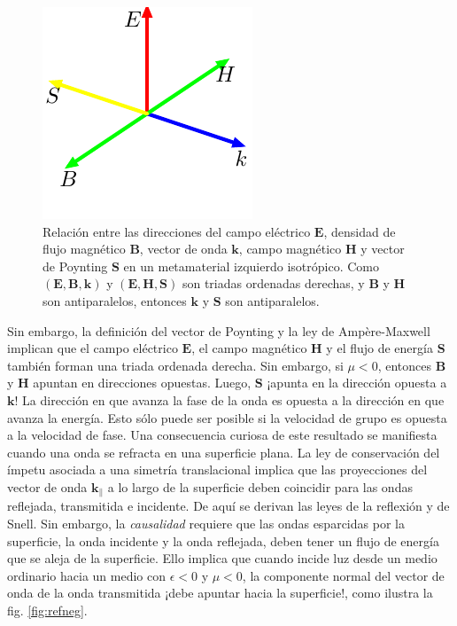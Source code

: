 \documentclass[12pt]{article}
\begin{document}
\begin{figure}
  \centering
  \includegraphics{talk-13}
  \caption{Relación entre las direcciones del campo eléctrico $\bm E$,
    densidad de flujo magnético $\bm B$, vector de onda $\bm k$, campo
    magnético $\bm H$ y vector de Poynting $\bm S$ en un metamaterial
    izquierdo isotrópico. Como $(\bm E, \bm B, \bm k)$ y
    $(\bm E, \bm H,\bm S)$ son triadas ordenadas derechas, y $\bm B$ y
    $\bm H$ son antiparalelos, entonces $\bm k$ y $\bm S$ son
    antiparalelos.  }
  \label{fig:triada}
\end{figure}
Sin embargo, la definición del vector de Poynting y la ley de
Ampère-Maxwell implican que el campo eléctrico $\bm E$, el campo
magnético $\bm H$ y el flujo de energía $\bm S$ también forman una
triada ordenada derecha. Sin embargo, si $\mu<0$, entonces $\bm B$ y
$\bm H$ apuntan en direcciones opuestas. Luego, $\bm S$ ¡apunta en la
dirección opuesta a $\bm k$! La dirección en que avanza la fase de la
onda es opuesta a la dirección en que avanza la energía. Esto sólo
puede ser posible si la velocidad de grupo es opuesta a la velocidad
de fase. Una consecuencia curiosa de este resultado se manifiesta
cuando una onda se refracta en una superficie plana. La ley de
conservación del ímpetu asociada a una simetría translacional implica
que las proyecciones del vector de onda $\bm k_\|$ a lo largo de la
superficie deben coincidir para las ondas reflejada,  transmitida e
incidente. De aquí se derivan las leyes de la reflexión y de
Snell. Sin embargo, la {\em causalidad} requiere que las ondas
esparcidas por la superficie, la onda incidente y la onda reflejada,
deben tener un flujo de energía que se aleja de la superficie. Ello
implica que cuando incide luz desde un medio ordinario hacia un medio
con $\epsilon<0$ y $\mu<0$, la componente normal del vector de onda de
la onda transmitida ¡debe apuntar hacia la superficie!, como ilustra
la fig. \ref{fig:refneg}.
\end{document}
